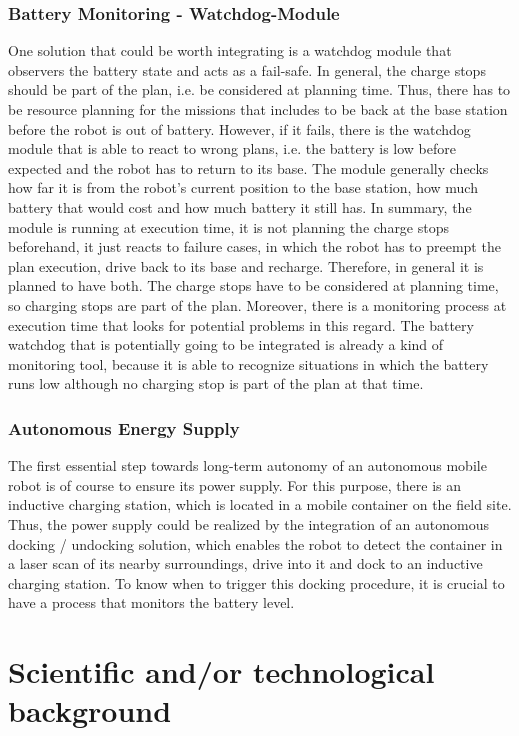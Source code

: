 \documentclass[english, master, expose, utf8]{base/thesis_KBS}
\begin{document}
\subsubsection{Battery Monitoring - Watchdog-Module}

One solution that could be worth integrating is a watchdog module that observers the battery state and acts as a fail-safe. In general, the charge stops should
be part of the plan, i.e. be considered at planning time. Thus, there has to be resource planning for the missions that includes to be back at the base station before
the robot is out of battery. However, if it fails, there is the watchdog module that is able to react to wrong plans, i.e. the battery is low before expected and the 
robot has to return to its base. The module generally checks how far it is from the robot's current position to the base station, how much battery that would cost and
how much battery it still has. In summary, the module is running at execution time, it is not planning the charge stops beforehand, it just reacts to failure cases, in which 
the robot has to preempt the plan execution, drive back to its base and recharge. Therefore, in general it is planned to have both. The charge stops have to be considered 
at planning time, so charging stops are part of the plan. Moreover, there is a monitoring process at execution time that looks for potential problems in this regard.
The battery watchdog that is potentially going to be integrated is already a kind of monitoring tool, because it is able to recognize situations 
in which the battery runs low although no charging stop is part of the plan at that time.

\subsubsection{Autonomous Energy Supply}

The first essential step towards long-term autonomy of an autonomous mobile robot is of course to ensure its power supply.
For this purpose, there is an inductive charging station, which is located in a mobile container on the field site.
Thus, the power supply could be realized by the integration of an autonomous docking / undocking solution, which enables the robot to detect
the container in a laser scan of its nearby surroundings, drive into it and dock to an inductive charging station.
To know when to trigger this docking procedure, it is crucial to have a process that monitors the battery level.

\section{Scientific and/or technological background}
\end{document}
